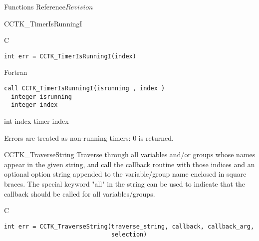 \begin{cactuspart}{ Functions Reference}{}{$Revision$}
\begin{FunctionDescription}{CCTK\_TimerIsRunningI}
\begin{SynopsisSection}
\begin{Synopsis}{C}
\begin{verbatim}
int err = CCTK_TimerIsRunningI(index)
\end{verbatim}
\end{Synopsis}
\begin{Synopsis}{Fortran}
\begin{verbatim}
call CCTK_TimerIsRunningI(isrunning , index )
  integer isrunning
  integer index
\end{verbatim}
\end{Synopsis}
\end{SynopsisSection}

\begin{ParameterSection}
\begin{Parameter} {int index}
timer index
\end{Parameter}
\end{ParameterSection}

\begin{Discussion}
Errors are treated as non-running timers: 0 is returned.
\end{Discussion}

\end{FunctionDescription}

\begin{FunctionDescription}{CCTK\_TraverseString}
\label{CCTK-TraverseString}
Traverse through all variables and/or groups whose names appear in the given
string, and call the callback routine with those indices and an optional
option string appended to the variable/group name enclosed in square braces.
The special keyword "all" in the string can be used to indicate that the
callback should be called for all variables/groups.

\begin{SynopsisSection}
\begin{Synopsis}{C}
\begin{verbatim}
int err = CCTK_TraverseString(traverse_string, callback, callback_arg,
                              selection)
\end{verbatim}
\end{Synopsis}
\end{SynopsisSection}


\end{FunctionDescription}
\end{cactuspart}
